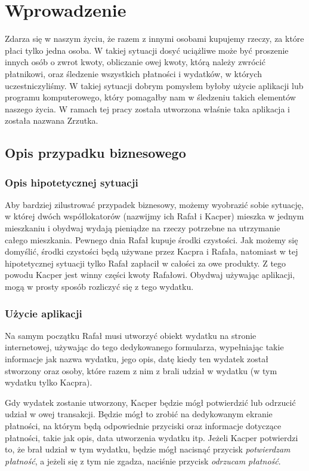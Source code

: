 \newpage %
\section{Wprowadzenie}

Zdarza się w naszym życiu, że razem z innymi osobami kupujemy rzeczy, za które płaci tylko jedna osoba. W takiej sytuacji dosyć uciążliwe może być proszenie innych osób o zwrot kwoty, obliczanie owej kwoty, którą należy zwrócić płatnikowi, oraz śledzenie wszystkich płatności i wydatków, w których uczestniczyliśmy. W takiej sytuacji dobrym pomysłem byłoby użycie aplikacji lub programu komputerowego, który pomagałby nam w śledzeniu takich elementów naszego życia. W ramach tej pracy została utworzona właśnie taka aplikacja i została nazwana Zrzutka.

\subsection{Opis przypadku biznesowego}
\subsubsection{Opis hipotetycznej sytuacji}

Aby bardziej zilustrować przypadek biznesowy, możemy wyobrazić sobie sytuację, w której dwóch współlokatorów (nazwijmy ich Rafał i Kacper) mieszka w jednym mieszkaniu i obydwaj wydają pieniądze na rzeczy potrzebne na utrzymanie całego mieszkania. Pewnego dnia Rafał kupuje środki czystości. Jak możemy się domyślić, środki czystości będą używane przez Kacpra i Rafała, natomiast w tej hipotetycznej sytuacji tylko Rafał zapłacił w całości za owe produkty. Z tego powodu Kacper jest winny części kwoty Rafałowi. Obydwaj używając aplikacji, mogą w prosty sposób rozliczyć się z tego wydatku.

\subsubsection{Użycie aplikacji}

Na samym początku Rafał musi utworzyć obiekt wydatku na stronie internetowej, używając do tego dedykowanego formularza, wypełniając takie informacje jak nazwa wydatku, jego opis, datę kiedy ten wydatek został stworzony oraz osoby, które razem z nim z brali udział w wydatku (w tym wydatku tylko Kacpra).

Gdy wydatek zostanie utworzony, Kacper będzie mógł potwierdzić lub odrzucić udział w owej transakcji. Będzie mógł to zrobić na dedykowanym ekranie płatności, na którym będą odpowiednie przyciski oraz informacje dotyczące płatności, takie jak opis, data utworzenia wydatku itp. Jeżeli Kacper potwierdzi to, że brał udział w tym wydatku, będzie mógł nacisnąć przycisk \emph{potwierdzam płatność}, a jeżeli się z tym nie zgadza, naciśnie przycisk \emph{odrzucam płatność}.

